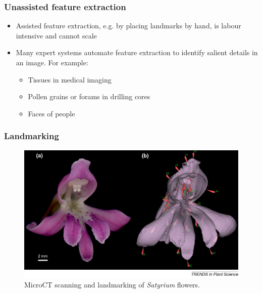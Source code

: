 \documentclass[]{beamer}
\begin{document}
    \begin{frame}
        \frametitle{Unassisted feature extraction}
        \begin{itemize}
            \item Assisted feature extraction, e.g. by placing landmarks by hand, is
            labour intensive and cannot scale
            \item Many expert systems automate feature extraction to identify salient
            details in an image. For example:
            \begin{itemize}
                \item Tissues in medical imaging
                \item Pollen grains or forams in drilling cores
                \item Faces of people
            \end{itemize}
        \end{itemize}
    \end{frame}


    \begin{frame}[plain]
        \frametitle{Landmarking}

        \begin{figure}[!htb]
              \includegraphics[width=\linewidth]{Timotheus_2010_MicroCT_landmarks}
              \caption*{MicroCT scanning and landmarking of \textit{Satyrium} flowers.\footnotemark}
            \endminipage\hfill
        \end{figure}

    \end{frame}
\end{document}
